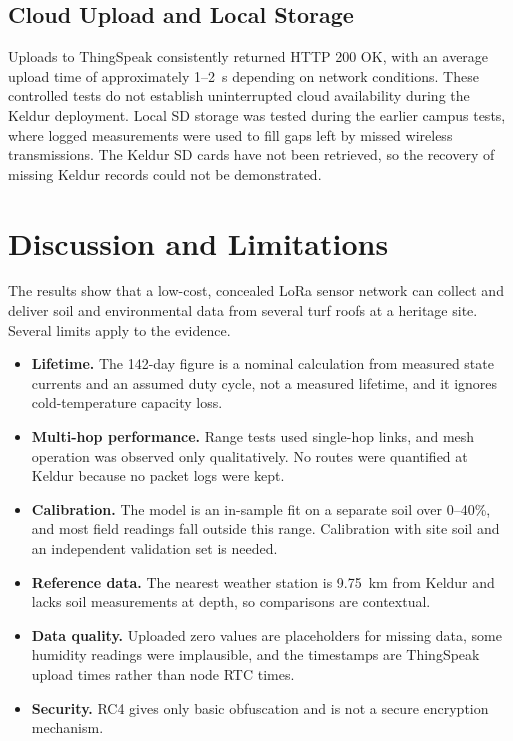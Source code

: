 \documentclass[conference]{IEEEtran}
\begin{document}
\subsection{Cloud Upload and Local Storage}
Uploads to ThingSpeak consistently returned HTTP 200 OK, with an average upload time of approximately 1--2~s depending on network conditions. These controlled tests do not establish uninterrupted cloud availability during the Keldur deployment. Local SD storage was tested during the earlier campus tests, where logged measurements were used to fill gaps left by missed wireless transmissions. The Keldur SD cards have not been retrieved, so the recovery of missing Keldur records could not be demonstrated.

\section{Discussion and Limitations}\label{sec:discussion}
The results show that a low-cost, concealed LoRa sensor network can collect and deliver soil and environmental data from several turf roofs at a heritage site. Several limits apply to the evidence.

\begin{itemize}
\item \textbf{Lifetime.} The 142-day figure is a nominal calculation from measured state currents and an assumed duty cycle, not a measured lifetime, and it ignores cold-temperature capacity loss.
\item \textbf{Multi-hop performance.} Range tests used single-hop links, and mesh operation was observed only qualitatively. No routes were quantified at Keldur because no packet logs were kept.
\item \textbf{Calibration.} The model is an in-sample fit on a separate soil over 0--40\%, and most field readings fall outside this range. Calibration with site soil and an independent validation set is needed.
\item \textbf{Reference data.} The nearest weather station is 9.75~km from Keldur and lacks soil measurements at depth, so comparisons are contextual.
\item \textbf{Data quality.} Uploaded zero values are placeholders for missing data, some humidity readings were implausible, and the timestamps are ThingSpeak upload times rather than node RTC times.
\item \textbf{Security.} RC4 gives only basic obfuscation and is not a secure encryption mechanism.
\end{itemize}
\end{document}
